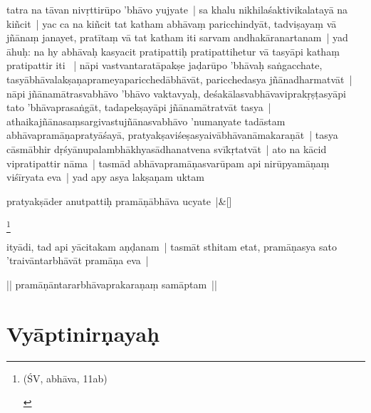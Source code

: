 \documentclass[article,12pt,a4paper]{memoir}%
\newcounter{parCount}
\begin{document}
	  
	  \pstart \leavevmode%
	\label{thakur75-105.5}tatra na tāvan nivṛttirūpo 'bhāvo yujyate | sa khalu nikhilaśaktivikalatayā na kiñcit | yac ca na kiñcit tat katham abhāvaṃ paricchindyāt, tadviṣayaṃ vā jñānaṃ janayet, pratītaṃ vā tat katham iti sarvam andhakāranartanam | yad āhuḥ: na hy abhāvaḥ kasyacit pratipattiḥ pratipattihetur vā tasyāpi kathaṃ pratipattir iti  | nāpi vastvantaratāpakṣe jaḍarūpo 'bhāvaḥ saṅgacchate, tasyābhāvalakṣaṇaprameyaparicchedābhāvāt, paricchedasya jñānadharmatvāt | nāpi jñānamātrasvabhāvo 'bhāvo vaktavyaḥ, deśakālasvabhāvaviprakṛṣṭasyāpi tato 'bhāvaprasaṅgāt, tadapekṣayāpi jñānamātratvāt tasya | athaikajñānasaṃsargivastujñānasvabhāvo 'numanyate tadāstam abhāvapramāṇapratyāśayā, pratyakṣaviśeṣasyaivābhāvanāmakaraṇāt | tasya cāsmābhir dṛśyānupalambhākhyasādhanatvena svīkṛtatvāt | ato na kācid vipratipattir nāma | tasmād abhāvapramāṇasvarūpam api nirūpyamāṇaṃ viśīryata eva | yad apy asya lakṣaṇam uktam
	{}
	\pend%
      
	    
	    \stanza[\smallbreak]
	  pratyakṣāder anutpattiḥ pramāṇābhāva ucyate |\&[\smallbreak]
	  
	  
	  \footnote{\begin{english}(ŚV, abhāva, 11ab)\end{english}}

	  
	  \pstart \leavevmode%
	ityādi, tad api yācitakam aṇḍanam | tasmāt sthitam etat, pramāṇasya sato 'traivāntarbhāvāt pramāṇa eva |
	{}
	\pend%
      

	  
	  \pstart \leavevmode%
	|| pramāṇāntararbhāvaprakaraṇaṃ samāptam || 
	{}
	\pend%
      
	    
	    \endnumbering%
	    
	  
	  
	
	    
	    \beginnumbering%
	    
	  
\chapter[{Vyāptinirṇayaḥ}][{Vyāptinirṇayaḥ}]{Vyāptinirṇayaḥ}\label{Vyāptinirṇayaḥ}
\end{document}
